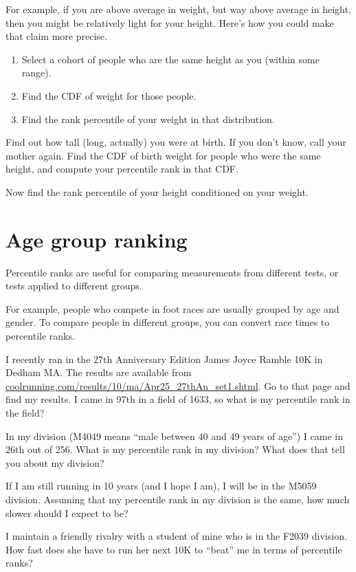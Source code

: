 \documentclass[12pt]{book}
\begin{document}
For example, if you are above average in weight, but way above average
in height, then you might be relatively light for your height.  Here's
how you could make that claim more precise.

\begin{enumerate}

\item Select a cohort of people who are the same height as you (within
some range).

\item Find the CDF of weight for those people.

\item Find the rank percentile of your weight in that distribution.

\end{enumerate}


\begin{ex}
Find out how tall (long, actually) you were at birth.  If you don't
know, call your mother again.  Find the CDF of birth weight for
people who were the same height, and compute your percentile rank
in that CDF.

Now find the rank percentile of your height conditioned on your weight.
\end{ex}


\section{Age group ranking}

Percentile ranks are useful for comparing measurements from different
tests, or tests applied to different groups.

For example, people who compete in foot races are usually grouped by
age and gender.  To compare people in different groups, you can convert
race times to percentile ranks.

\begin{ex}

I recently ran in the 27th Anniversary Edition James Joyce Ramble 10K
in Dedham MA.  The results are available from
\url{coolrunning.com/results/10/ma/Apr25_27thAn_set1.shtml}.
Go to that page and find my results.  I came in 97th in a field
of 1633, so what is my percentile rank in the field?

In my division (M4049 means ``male between 40 and 49 years of age'')
I came in 26th out of 256.  What is my percentile rank in my division?
What does that tell you about my division?

If I am still running in 10 years (and I hope I am), I will be in
the M5059 division.  Assuming that my percentile rank in my division
is the same, how much slower should I expect to be?

I maintain a friendly rivalry with a student of mine who is in the
F2039 division.  How fast does she have to run her next 10K to
``beat'' me in terms of percentile ranks?

\end{ex}
\end{document}
